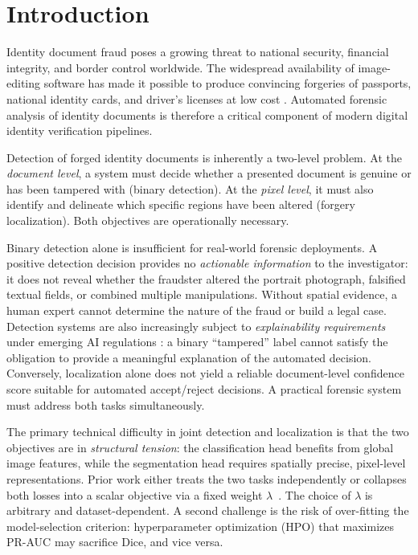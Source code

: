
\section{Introduction}
\label{sec:intro}

Identity document fraud poses a growing threat to national security, financial
integrity, and border control worldwide. The widespread availability of
image-editing software has made it possible to produce convincing forgeries of
passports, national identity cards, and driver's licenses at low cost
\citep{europol2022deepfakes}. Automated forensic analysis of identity documents
is therefore a critical component of modern digital identity verification
pipelines.

Detection of forged identity documents is inherently a two-level problem. At the
\emph{document level}, a system must decide whether a presented document is
genuine or has been tampered with (binary detection). At the \emph{pixel level},
it must also identify and delineate which specific regions have been altered
(forgery localization). Both objectives are operationally necessary.

Binary detection alone is insufficient for real-world forensic deployments.
A positive detection decision provides no \emph{actionable information} to the
investigator: it does not reveal whether the fraudster altered the portrait
photograph, falsified textual fields, or combined multiple manipulations. Without
spatial evidence, a human expert cannot determine the nature of the fraud or
build a legal case. Detection systems are also increasingly subject to
\emph{explainability requirements} under emerging AI regulations
\citep{euaiact2024}: a binary ``tampered'' label cannot satisfy the obligation
to provide a meaningful explanation of the automated decision. Conversely,
localization alone does not yield a reliable document-level confidence score
suitable for automated accept/reject decisions. A practical forensic system must
address both tasks simultaneously.

The primary technical difficulty in joint detection and localization is that the
two objectives are in \emph{structural tension}: the classification head
benefits from global image features, while the segmentation head requires
spatially precise, pixel-level representations. Prior work either treats the
two tasks independently \citep{trufor2023} or collapses both losses into a
scalar objective via a fixed weight $\lambda$~\citep{caruana1997multitask,
kendall2018multi}. The choice of $\lambda$ is arbitrary and dataset-dependent.
A second challenge is the risk of over-fitting the model-selection criterion:
hyperparameter optimization (HPO) that maximizes PR-AUC may sacrifice Dice, and vice versa.

